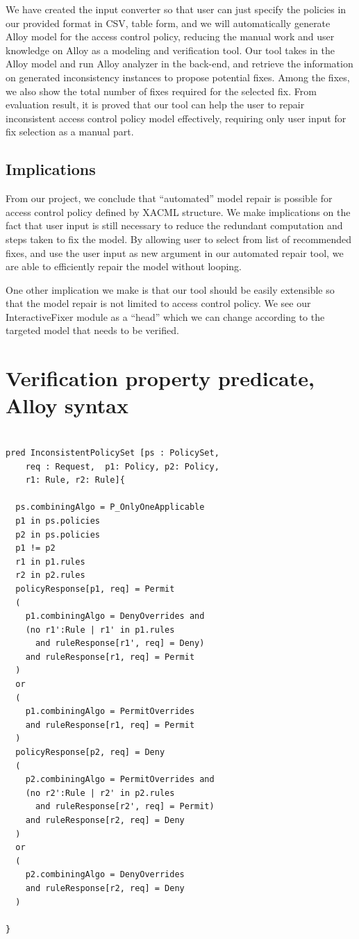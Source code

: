 \documentclass{acm_proc_article-sp}
\begin{document}
We have created the input converter so that user can just specify the policies in our provided format in CSV, table form, and we will automatically generate Alloy model for the access control policy, reducing the manual work and user knowledge on Alloy as a modeling and verification tool. Our tool takes in the Alloy model and run Alloy analyzer in the back-end, and retrieve the information on generated inconsistency instances to propose potential fixes. Among the fixes, we also show the total number of fixes required for the selected fix. From evaluation result, it is proved that our tool can help the user to repair inconsistent access control policy model effectively, requiring only user input for fix selection as a manual part. 

\subsection{Implications}

From our project, we conclude that ``automated'' model repair is possible for access control policy defined by XACML structure. We make implications on the fact that user input is still necessary to reduce the redundant computation and steps taken to fix the model. By allowing user to select from list of recommended fixes, and use the user input as new argument in our automated repair tool, we are able to efficiently repair the model without looping.

One other implication we make is that our tool should be easily extensible so that the model repair is not limited to access control policy. We see our InteractiveFixer module as a ``head'' which we can change according to the targeted model that needs to be verified. 


{}


\appendix
\section{Verification property predicate, Alloy syntax} \label{A}

\begin{verbatim}

pred InconsistentPolicySet [ps : PolicySet, 
    req : Request,  p1: Policy, p2: Policy, 
    r1: Rule, r2: Rule]{

  ps.combiningAlgo = P_OnlyOneApplicable 
  p1 in ps.policies
  p2 in ps.policies
  p1 != p2
  r1 in p1.rules
  r2 in p2.rules
  policyResponse[p1, req] = Permit
  (
    p1.combiningAlgo = DenyOverrides and
    (no r1':Rule | r1' in p1.rules 
      and ruleResponse[r1', req] = Deny)
    and ruleResponse[r1, req] = Permit
  )
  or
  (
    p1.combiningAlgo = PermitOverrides
    and ruleResponse[r1, req] = Permit
  )
  policyResponse[p2, req] = Deny
  (
    p2.combiningAlgo = PermitOverrides and
    (no r2':Rule | r2' in p2.rules 
      and ruleResponse[r2', req] = Permit)
    and ruleResponse[r2, req] = Deny
  )
  or
  (
    p2.combiningAlgo = DenyOverrides
    and ruleResponse[r2, req] = Deny
  )

}

\end{verbatim}



\balancecolumns
\end{document}
